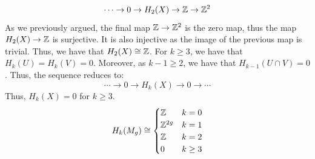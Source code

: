 \documentclass[12pt]{article}
\begin{document}
\begin{solution}
\begin{enumerate}
        \[ \cdots \to 0 \to H_2(X) \to \mathbb Z \to \mathbb Z^2 \]
        As we previously argued, the final map $\mathbb Z \to \mathbb Z^2$ is the zero map, thus the map $H_2(X) \to \mathbb Z$ is surjective. It is also injective as the image of the previous map is trivial. Thus, we have that $H_2(X) \cong \mathbb Z$. \bbni
        For $k \geq 3$, we have that $H_k(U) = H_k(V) = 0$. Moreover, as $k-1 \geq 2$, we have that $H_{k-1}(U \cap V) = 0$. Thus, the sequence reduces to:
        \[ \cdots \to 0 \to H_k(X) \to 0 \to \cdots\]
        Thus, $H_k(X) = 0$ for $k \geq 3$.
        \[ H_k(M_g) \cong \begin{cases} \mathbb Z & k = 0 \\ \mathbb Z^{2g} & k = 1 \\ \mathbb Z & k = 2 \\ 0 & k \geq 3 \end{cases} \]


\end{enumerate}
\end{solution}
\end{document}
